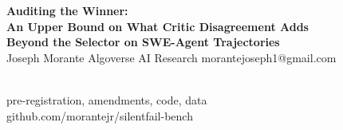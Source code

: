 \documentclass{article}
\begin{document}
\begin{minipage}[t]{0.78\textwidth}
{\fontsize{84}{92}\selectfont\bfseries\color{ink} Auditing the Winner:\\ An Upper Bound on What Critic Disagreement Adds\\ Beyond the Selector on SWE-Agent Trajectories}\\[14pt]
{\fontsize{40}{46}\selectfont Joseph Morante \quad\textcolor{mute}{Algoverse AI Research \quad\textperiodcentered\quad morantejoseph1@gmail.com}}
\end{minipage}\hfill
\begin{minipage}[t]{0.19\textwidth}\raggedleft
\vspace{0pt}\\[8pt]
{\fontsize{26}{30}\selectfont\color{mute} pre-registration, amendments, code, data\\ github.com/morantejr/silentfail-bench}
\end{minipage}
\end{document}
